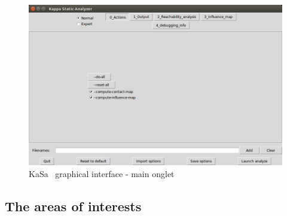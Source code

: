 \documentclass[11pt]{book}
\def\KaSa{\textsf{KaSa}}
\begin{document}
\begin{figure}[htbp]
\centering
\includegraphics[width=12cm,natwidth=920pt,natheight=582pt]{img/kasa_0.png}
\caption{\KaSa~ graphical interface - main onglet}
\label{fig:kasa:0}
\end{figure}

\subsection{The areas of interests} 
\end{document}
